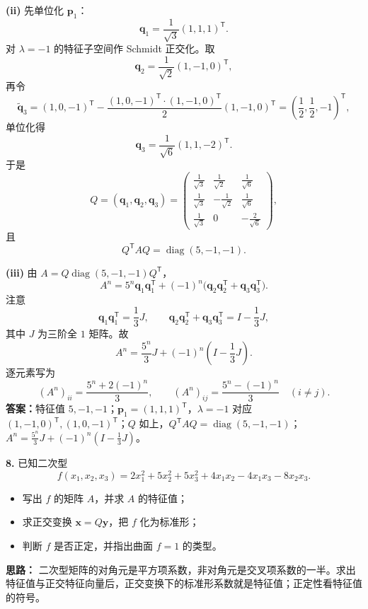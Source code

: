 \textbf{(ii)} 先单位化 \(\boldsymbol{p}_1\)：
\[
\boldsymbol{q}_1=\frac1{\sqrt3}(1,1,1)^{\mathsf T}.
\]
对 \(\lambda=-1\) 的特征子空间作 Schmidt 正交化。取
\[
\boldsymbol{q}_2=\frac1{\sqrt2}(1,-1,0)^{\mathsf T},
\]
再令
\[
\widetilde{\boldsymbol{q}}_3=(1,0,-1)^{\mathsf T}
-\frac{(1,0,-1)^{\mathsf T}\cdot(1,-1,0)^{\mathsf T}}{2}(1,-1,0)^{\mathsf T}
=\left(\frac12,\frac12,-1\right)^{\mathsf T},
\]
单位化得
\[
\boldsymbol{q}_3=\frac1{\sqrt6}(1,1,-2)^{\mathsf T}.
\]
于是
\[
Q=(\boldsymbol{q}_1,\boldsymbol{q}_2,\boldsymbol{q}_3)
=\begin{pmatrix}
\frac1{\sqrt3}&\frac1{\sqrt2}&\frac1{\sqrt6}\\[4pt]
\frac1{\sqrt3}&-\frac1{\sqrt2}&\frac1{\sqrt6}\\[4pt]
\frac1{\sqrt3}&0&-\frac2{\sqrt6}
\end{pmatrix},
\]
且
\[
Q^{\mathsf T}AQ=\operatorname{diag}(5,-1,-1).
\]

\textbf{(iii)} 由 \(A=Q\operatorname{diag}(5,-1,-1)Q^{\mathsf T}\)，
\[
A^n=5^n\boldsymbol{q}_1\boldsymbol{q}_1^{\mathsf T}
+(-1)^n\bigl(\boldsymbol{q}_2\boldsymbol{q}_2^{\mathsf T}
+\boldsymbol{q}_3\boldsymbol{q}_3^{\mathsf T}\bigr).
\]
注意
\[
\boldsymbol{q}_1\boldsymbol{q}_1^{\mathsf T}=\frac13J,\qquad
\boldsymbol{q}_2\boldsymbol{q}_2^{\mathsf T}+\boldsymbol{q}_3\boldsymbol{q}_3^{\mathsf T}
=I-\frac13J,
\]
其中 \(J\) 为三阶全 \(1\) 矩阵。故
\[
A^n=\frac{5^n}{3}J+(-1)^n\left(I-\frac13J\right).
\]
逐元素写为
\[
(A^n)_{ii}=\frac{5^n+2(-1)^n}{3},\qquad
(A^n)_{ij}=\frac{5^n-(-1)^n}{3}\quad(i\ne j).
\]
\textbf{答案：}特征值 $5,-1,-1$；$\boldsymbol{p}_1=(1,1,1)^{\mathsf T}$，$\lambda=-1$ 对应 $(1,-1,0)^{\mathsf T},(1,0,-1)^{\mathsf T}$；$Q$ 如上，$Q^{\mathsf T}AQ=\operatorname{diag}(5,-1,-1)$；$A^n=\frac{5^n}{3}J+(-1)^n(I-\frac13J)$。
\else \answerarea[10] \fi%

\textbf{8.} 已知二次型
\[
f(x_1,x_2,x_3)=2x_1^2+5x_2^2+5x_3^2+4x_1x_2-4x_1x_3-8x_2x_3.
\]
\begin{itemize}
  \item[(i)] 写出 \(f\) 的矩阵 \(A\)，并求 \(A\) 的特征值；
  \item[(ii)] 求正交变换 \(\boldsymbol{x}=Q\boldsymbol{y}\)，把 \(f\) 化为标准形；
  \item[(iii)] 判断 \(f\) 是否正定，并指出曲面 \(f=1\) 的类型。
\end{itemize}

\ifshowsolutions%
\textbf{思路：} 二次型矩阵的对角元是平方项系数，非对角元是交叉项系数的一半。求出特征值与正交特征向量后，正交变换下的标准形系数就是特征值；正定性看特征值的符号。

